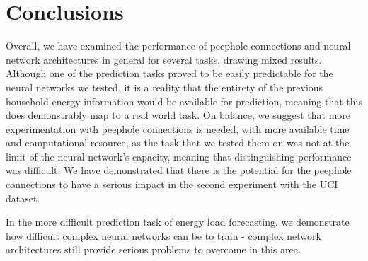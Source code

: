 \documentclass{article} %
\begin{document}
\section{Conclusions}
\label{sec:conclusions}

Overall, we have examined the performance of peephole connections and neural network architectures in general for several tasks, drawing mixed results. Although one of the prediction tasks proved to be easily predictable for the neural networks we tested, it is a reality that the entirety of the previous household energy information would be available for prediction, meaning that this does demonstrably map to a real world task. On balance, we suggest that more experimentation with peephole connections is needed, with more available time and computational resource, as the task that we tested them on was not at the limit of the neural network's capacity, meaning that distinguishing performance was difficult. We have demonstrated that there is the potential for the peephole connections to have a serious impact in the second experiment with the UCI dataset. 

In the more difficult prediction task of energy load forecasting, we demonstrate how difficult complex neural networks can be to train - complex network architectures still provide serious problems to overcome in this area. 
\end{document}
